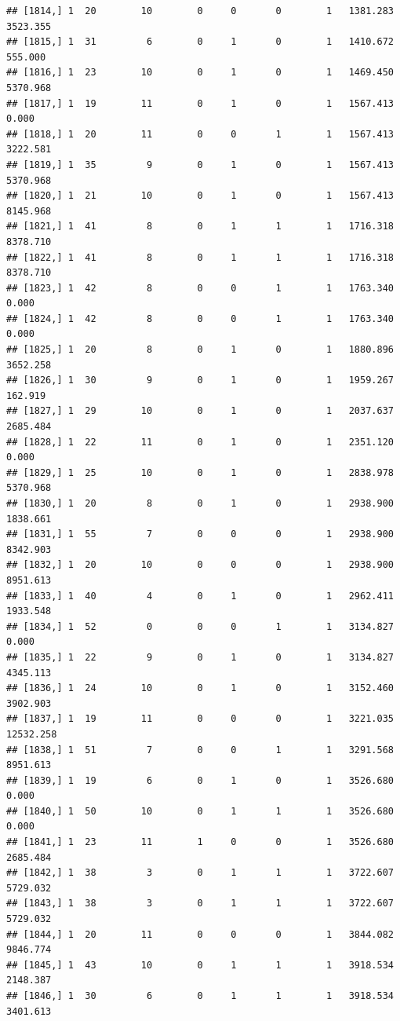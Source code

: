 \documentclass[
]{article}
\begin{document}
\begin{verbatim}
## [1814,] 1  20        10        0     0       0        1   1381.283   3523.355
## [1815,] 1  31         6        0     1       0        1   1410.672    555.000
## [1816,] 1  23        10        0     1       0        1   1469.450   5370.968
## [1817,] 1  19        11        0     1       0        1   1567.413      0.000
## [1818,] 1  20        11        0     0       1        1   1567.413   3222.581
## [1819,] 1  35         9        0     1       0        1   1567.413   5370.968
## [1820,] 1  21        10        0     1       0        1   1567.413   8145.968
## [1821,] 1  41         8        0     1       1        1   1716.318   8378.710
## [1822,] 1  41         8        0     1       1        1   1716.318   8378.710
## [1823,] 1  42         8        0     0       1        1   1763.340      0.000
## [1824,] 1  42         8        0     0       1        1   1763.340      0.000
## [1825,] 1  20         8        0     1       0        1   1880.896   3652.258
## [1826,] 1  30         9        0     1       0        1   1959.267    162.919
## [1827,] 1  29        10        0     1       0        1   2037.637   2685.484
## [1828,] 1  22        11        0     1       0        1   2351.120      0.000
## [1829,] 1  25        10        0     1       0        1   2838.978   5370.968
## [1830,] 1  20         8        0     1       0        1   2938.900   1838.661
## [1831,] 1  55         7        0     0       0        1   2938.900   8342.903
## [1832,] 1  20        10        0     0       0        1   2938.900   8951.613
## [1833,] 1  40         4        0     1       0        1   2962.411   1933.548
## [1834,] 1  52         0        0     0       1        1   3134.827      0.000
## [1835,] 1  22         9        0     1       0        1   3134.827   4345.113
## [1836,] 1  24        10        0     1       0        1   3152.460   3902.903
## [1837,] 1  19        11        0     0       0        1   3221.035  12532.258
## [1838,] 1  51         7        0     0       1        1   3291.568   8951.613
## [1839,] 1  19         6        0     1       0        1   3526.680      0.000
## [1840,] 1  50        10        0     1       1        1   3526.680      0.000
## [1841,] 1  23        11        1     0       0        1   3526.680   2685.484
## [1842,] 1  38         3        0     1       1        1   3722.607   5729.032
## [1843,] 1  38         3        0     1       1        1   3722.607   5729.032
## [1844,] 1  20        11        0     0       0        1   3844.082   9846.774
## [1845,] 1  43        10        0     1       1        1   3918.534   2148.387
## [1846,] 1  30         6        0     1       1        1   3918.534   3401.613

\end{verbatim}
\end{document}
